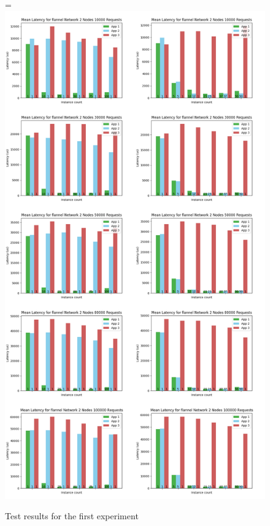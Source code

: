 \documentclass[12pt,oneandhalf,chaparabic,ceng,ms,eng,oneside,pntc]{gsufbe}
\makeatletter
\let\old@includegraphics\includegraphics
\renewcommand{\includegraphics}[2][,]{%
  \setbox9=\hbox{\old@includegraphics[#1]{#2}}%
  \ifdim\wd9>\textwidth
    \old@includegraphics[#1,width=\textwidth]{#2}%
  \else
    \old@includegraphics[#1]{#2}%
  \fi%
}
\makeatother
\begin{document}
\begin{figure}
\centering
\includegraphics[]{flannel.png}
\caption{Test results for the first experiment}
\label{flannel}
\end{figure}
\end{document}
